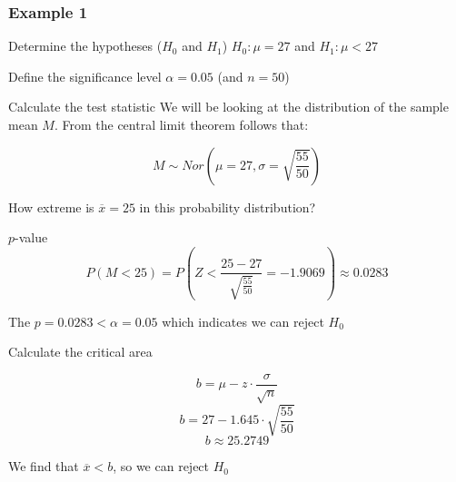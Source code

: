 \documentclass{beamer}
\begin{document}
\begin{frame}
  \frametitle{Example 1}
  \begin{block}{Determine the hypotheses ($H_0$ and $H_1$)}
    $H_{0} : \mu = 27$ and $H_{1}: \mu < 27$
  \end{block}


  \begin{block}{Define the significance level}
  $\alpha = 0.05$ (and $n=50$)
  \end{block}


  \begin{block}{Calculate the test statistic}
    We will be looking at the distribution of the sample mean $M$. From the central limit theorem follows that:

    \[ M \sim Nor(\mu = 27, \sigma = \sqrt{\frac{55}{50}}) \]
    
    How extreme is $\overline{x}= 25$ in this probability distribution?
  \end{block}
\end{frame}

\begin{frame}
  \begin{block}{$p$-value}
    \[ P(M < 25) = P \left(Z < \frac{25 - 27}{\sqrt{\frac{55}{50}}} = -1.9069 \right) \approx 0.0283  \]
    
    The $p = 0.0283 < \alpha = 0.05$ which indicates we can reject  $H_{0}$
    \end{block}
  
    \begin{block}{Calculate the critical area}
    
    \[ b = \mu - z \cdot \frac{\sigma}{\sqrt{n}} \]
    \[ b = 27 - 1.645 \cdot \sqrt{\frac{55}{50}} \]
    \[ b \approx 25.2749 \]
  
    We find that $\overline{x} < b$, so we can reject $H_{0}$
  \end{block}

\end{frame}

\begin{frame}
    \centering
\end{frame}
\end{document}

